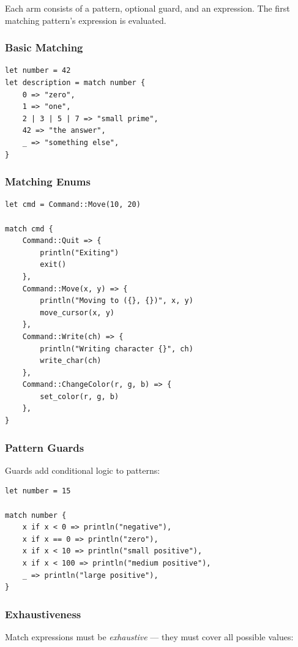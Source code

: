 Each arm consists of a pattern, optional guard, and an expression. The first matching pattern's expression is evaluated.

\subsubsection{Basic Matching}

\begin{lstlisting}
let number = 42
let description = match number {
    0 => "zero",
    1 => "one",
    2 | 3 | 5 | 7 => "small prime",
    42 => "the answer",
    _ => "something else",
}
\end{lstlisting}

\subsubsection{Matching Enums}

\begin{lstlisting}
let cmd = Command::Move(10, 20)

match cmd {
    Command::Quit => {
        println("Exiting")
        exit()
    },
    Command::Move(x, y) => {
        println("Moving to ({}, {})", x, y)
        move_cursor(x, y)
    },
    Command::Write(ch) => {
        println("Writing character {}", ch)
        write_char(ch)
    },
    Command::ChangeColor(r, g, b) => {
        set_color(r, g, b)
    },
}
\end{lstlisting}

\subsubsection{Pattern Guards}

Guards add conditional logic to patterns:

\begin{lstlisting}
let number = 15

match number {
    x if x < 0 => println("negative"),
    x if x == 0 => println("zero"),
    x if x < 10 => println("small positive"),
    x if x < 100 => println("medium positive"),
    _ => println("large positive"),
}
\end{lstlisting}

\subsubsection{Exhaustiveness}

Match expressions must be \textit{exhaustive} --- they must cover all possible values:

